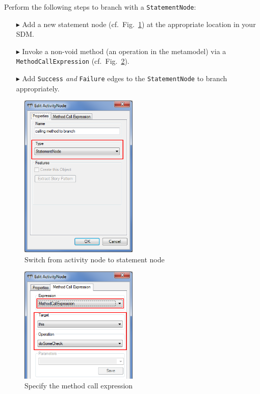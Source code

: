 Perform the following steps to branch with a \texttt{StatementNode}:
\begin{enumerate}
\item[$\blacktriangleright$] Add a new statement node (cf.~Fig.~\ref{fig:cond_statement_node}) at the appropriate location in your SDM.
\item[$\blacktriangleright$] Invoke a non-void method (an operation in the metamodel) via a \texttt{MethodCallExpression} (cf.~Fig.~\ref{fig:cond_method_call}). 
\item[$\blacktriangleright$] Add \texttt{Success} \emph{and} \texttt{Failure} edges to the \texttt{StatementNode} to branch appropriately.
\end{enumerate}

\begin{figure}[htp]
\begin{center}
  \includegraphics[width=0.5\textwidth]{pics/advancedTopics/branching/01_switch_to_statement_node}
  \caption{Switch from activity node to statement node}
  \label{fig:cond_statement_node}
\end{center}
\end{figure}

\begin{figure}[htp]
\begin{center}
  \includegraphics[width=0.5\textwidth]{pics/advancedTopics/branching/02_specify_method_call_expression}
  \caption{Specify the method call expression}
  \label{fig:cond_method_call}
\end{center}
\end{figure}


